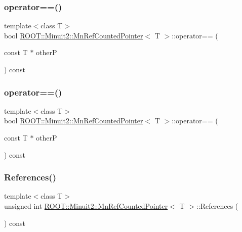 \subsubsection{\texorpdfstring{operator==()}{operator==()}\hspace{0.1cm}{\footnotesize\ttfamily [2/3]}}
{\footnotesize\ttfamily template$<$class T$>$ \\
bool \mbox{\hyperlink{classROOT_1_1Minuit2_1_1MnRefCountedPointer}{R\+O\+O\+T\+::\+Minuit2\+::\+Mn\+Ref\+Counted\+Pointer}}$<$ T $>$\+::operator== (\begin{DoxyParamCaption}\item[{const T $\ast$}]{otherP }\end{DoxyParamCaption}) const\hspace{0.3cm}{\ttfamily [inline]}}

\mbox{\label{classROOT_1_1Minuit2_1_1MnRefCountedPointer_a2dbec0c22ef3492abc24cdaa885fd26e}} 
\subsubsection{\texorpdfstring{operator==()}{operator==()}\hspace{0.1cm}{\footnotesize\ttfamily [3/3]}}
{\footnotesize\ttfamily template$<$class T$>$ \\
bool \mbox{\hyperlink{classROOT_1_1Minuit2_1_1MnRefCountedPointer}{R\+O\+O\+T\+::\+Minuit2\+::\+Mn\+Ref\+Counted\+Pointer}}$<$ T $>$\+::operator== (\begin{DoxyParamCaption}\item[{const T $\ast$}]{otherP }\end{DoxyParamCaption}) const\hspace{0.3cm}{\ttfamily [inline]}}

\mbox{\label{classROOT_1_1Minuit2_1_1MnRefCountedPointer_acffac58848d817d7747631954daf3e0c}} 
\subsubsection{\texorpdfstring{References()}{References()}\hspace{0.1cm}{\footnotesize\ttfamily [1/3]}}
{\footnotesize\ttfamily template$<$class T$>$ \\
unsigned int \mbox{\hyperlink{classROOT_1_1Minuit2_1_1MnRefCountedPointer}{R\+O\+O\+T\+::\+Minuit2\+::\+Mn\+Ref\+Counted\+Pointer}}$<$ T $>$\+::References (\begin{DoxyParamCaption}{ }\end{DoxyParamCaption}) const\hspace{0.3cm}{\ttfamily [inline]}}

